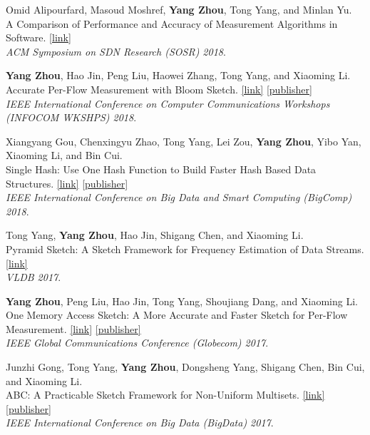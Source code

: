 \documentclass[letterpaper, 11pt]{article}
\newcounter{mySaveCounter}
\newenvironment{myEnumerateCitation}{%
  \begin{enumerate}[label={[\arabic*]},ref={[\arabic*]}]
    \usecounter{enumi}%
    \setcounter{enumi}{\value{mySaveCounter}}
    \setlength{\itemsep}{0pt}%
    \setlength{\parskip}{5pt}%
}
{%
  \setcounter{mySaveCounter}{\value{enumi}}\end{enumerate}%
}
\begin{document}
\begin{myEnumerateCitation}
\item Omid Alipourfard, Masoud Moshref, \textbf{Yang Zhou}, Tong Yang, and Minlan Yu. 
\\A Comparison of Performance and Accuracy of Measurement Algorithms in Software. \href{https://dl.acm.org/doi/epdf/10.1145/3185467.3185475}{[link]}
\\\textit{ACM Symposium on SDN Research (SOSR) 2018}.

\item \textbf{Yang Zhou}, Hao Jin, Peng Liu, Haowei Zhang, Tong Yang, and Xiaoming Li. 
\\Accurate Per-Flow Measurement with Bloom Sketch. \href{https://yangzhou1997.github.io/paper/bs-infocom18.pdf}{[link]} \href{https://ieeexplore.ieee.org/document/8406964}{[publisher]}
\\\textit{IEEE International Conference on Computer Communications Workshops (INFOCOM WKSHPS) 2018}.

\item Xiangyang Gou, Chenxingyu Zhao, Tong Yang, Lei Zou, \textbf{Yang Zhou}, Yibo Yan, Xiaoming Li, and Bin Cui. 
\\Single Hash: Use One Hash Function to Build Faster Hash Based Data Structures. \href{https://yangzhou1997.github.io/paper/singlehash-bigcomp18.pdf}{[link]} \href{https://ieeexplore.ieee.org/document/8367128}{[publisher]}
\\\textit{IEEE International Conference on Big Data and Smart Computing (BigComp) 2018}.

\item Tong Yang, \textbf{Yang Zhou}, Hao Jin, Shigang Chen, and Xiaoming Li. 
\\Pyramid Sketch: A Sketch Framework for Frequency Estimation of Data Streams. \href{https://www.vldb.org/pvldb/vol10/p1442-yang.pdf}{[link]}
\\\textit{VLDB 2017}.

\item \textbf{Yang Zhou}, Peng Liu, Hao Jin, Tong Yang, Shoujiang Dang, and Xiaoming Li. 
\\One Memory Access Sketch: A More Accurate and Faster Sketch for Per-Flow Measurement. \href{https://yangzhou1997.github.io/paper/om-globecom17.pdf}{[link]} \href{https://ieeexplore.ieee.org/document/8254741}{[publisher]}
\\\textit{IEEE Global Communications Conference (Globecom) 2017}.

\item Junzhi Gong, Tong Yang, \textbf{Yang Zhou}, Dongsheng Yang, Shigang Chen, Bin Cui, and Xiaoming Li. 
\\ABC: A Practicable Sketch Framework for Non-Uniform Multisets. \href{https://yangzhou1997.github.io/paper/abc-bigdata17.pdf}{[link]} \href{https://ieeexplore.ieee.org/document/8258193}{[publisher]}
\\\textit{IEEE International Conference on Big Data (BigData) 2017}.

\end{myEnumerateCitation}
\end{document}
